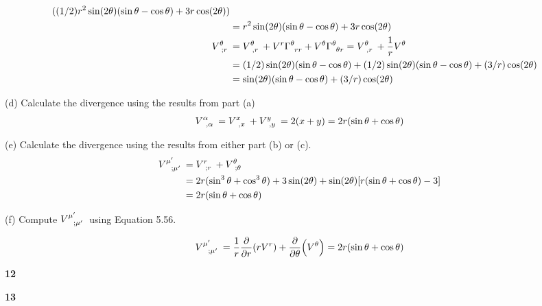 \message{ !name(gr-ch5-notes.tex)}\documentclass[gr-notes.tex]{subfiles}
\begin{document}
\begin{align*}
  ((1/2) r^2 \sin(2\theta) (\sin\theta - \cos\theta) + 3 r \cos(2\theta))
  \\ &=
  r^2 \sin(2\theta) (\sin\theta - \cos\theta) + 3 r \cos(2\theta)
  \\
  \tensor{V}{^\theta_{;r}} &=
  \tensor{V}{^\theta_{,r}} +
  V^r \tensor{\Gamma}{^\theta_{rr}} +
  V^\theta \tensor{\Gamma}{^\theta_{\theta r}} =
  \tensor{V}{^\theta_{,r}} +
  \frac{1}{r}
  V^\theta
  \\ &=
  (1/2) \sin(2\theta) (\sin\theta - \cos\theta) +
  (1/2) \sin(2\theta) (\sin\theta - \cos\theta) +
  (3/r) \cos(2\theta)
  \\ &=
  \sin(2\theta) (\sin\theta - \cos\theta) +
  (3/r) \cos(2\theta)
\end{align*}


(d)
Calculate the divergence using the results from part (a)
%
\begin{displaymath}
  \tensor{V}{^\alpha_{,\alpha}} =
  \tensor{V}{^x_{,x}} + \tensor{V}{^y_{,y}} =
  2 (x + y) =
  2 r (\sin\theta + \cos\theta)
\end{displaymath}


(e)
Calculate the divergence using the results from either part (b) or (c).
%
\begin{align*}
  \tensor{V}{^{\mu'}_{;\mu'}} &=
  \tensor{V}{^{r}_{;r}} +
  \tensor{V}{^{\theta}_{;\theta}}
  \\ &=
  2 r (\sin^3\theta + \cos^3\theta) +
  3 \sin(2\theta) +
  \sin(2\theta) [r (\sin\theta + \cos\theta) - 3]
  \\ &=
  2 r (\sin\theta + \cos\theta)
\end{align*}



(f)
Compute $\tensor{V}{^{\mu'}_{;\mu'}}$ using Equation 5.56.

\begin{displaymath}
  \tensor{V}{^{\mu'}_{;\mu'}} =
  \frac{1}{r} \pdv{r} (r V^r) + \pdv{\theta} (V^\theta) =
  2 r (\sin\theta + \cos\theta)
\end{displaymath}




\textbf{12}

\textbf{13}
\end{document}
